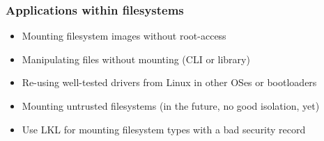 

\begin{frame}

    \frametitle{Applications within filesystems}
    
        \begin{itemize}
            \item Mounting filesystem images without root-access
            \item Manipulating files without mounting (CLI or library)
            \item Re-using well-tested drivers from Linux in other OSes or bootloaders
            \item Mounting untrusted filesystems (in the future, no good isolation, yet)
            \item Use LKL for mounting filesystem types with a bad security record
        \end{itemize}

\end{frame}